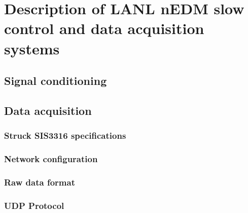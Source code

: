 
\chapter{Description of LANL nEDM slow control and data acquisition systems}



\section{Signal conditioning}



\section{Data acquisition}



\subsection{Struck SIS3316 specifications}



\subsection{Network configuration}



\subsection{Raw data format}



\subsection{UDP Protocol}

